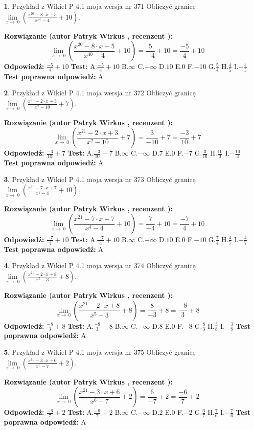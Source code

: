 \documentclass[12pt, a4paper]{article}
\theoremstyle{definition} %
\newtheorem{zad}{}
\newcommand{\zadStart}[1]{\begin{zad}#1\newline}
\newcommand{\zadStop}{\end{zad}}
\newcommand{\rozwStart}[2]{\noindent \textbf{Rozwiązanie (autor #1 , recenzent #2): }\newline}
\newcommand{\rozwStop}{\newline}
\newcommand{\odpStart}{\noindent \textbf{Odpowiedź:}\newline}
\newcommand{\odpStop}{\newline}
\newcommand{\testStart}{\noindent \textbf{Test:}\newline}
\newcommand{\testStop}{\newline}
\newcommand{\kluczStart}{\noindent \textbf{Test poprawna odpowiedź:}\newline}
\newcommand{\kluczStop}{\newline}
\begin{document}
\zadStart{Przykład z Wikieł P 4.1 moja wersja nr 371}
Obliczyć granicę $\lim\limits_{x\to\ 0}(\frac{x^{20}-8 \cdot x +5}{x^{40}-4}+10)$.
\zadStop
\rozwStart{Patryk Wirkus}{}
$$\lim\limits_{x\to\ 0}(\frac{x^{20}-8 \cdot x +5}{x^{40}-4}+10)=\frac{5}{-4}+10=\frac{-5}{4}+10$$
\rozwStop
\odpStart
$\frac{-5}{4}+10$
\odpStop
\testStart
A.$\frac{-5}{4}+10$
B.$\infty$
C.$-\infty$
D.$10$
E.$0$
F.$-10$
G.$\frac{5}{4}$
H.$\frac{4}{5}$
I.$-\frac{4}{5}$
\testStop
\kluczStart
A
\kluczStop



\zadStart{Przykład z Wikieł P 4.1 moja wersja nr 372}
Obliczyć granicę $\lim\limits_{x\to\ 0}(\frac{x^{21}-2 \cdot x +3}{x^{2}-10}+7)$.
\zadStop
\rozwStart{Patryk Wirkus}{}
$$\lim\limits_{x\to\ 0}(\frac{x^{21}-2 \cdot x +3}{x^{2}-10}+7)=\frac{3}{-10}+7=\frac{-3}{10}+7$$
\rozwStop
\odpStart
$\frac{-3}{10}+7$
\odpStop
\testStart
A.$\frac{-3}{10}+7$
B.$\infty$
C.$-\infty$
D.$7$
E.$0$
F.$-7$
G.$\frac{3}{10}$
H.$\frac{10}{3}$
I.$-\frac{10}{3}$
\testStop
\kluczStart
A
\kluczStop



\zadStart{Przykład z Wikieł P 4.1 moja wersja nr 373}
Obliczyć granicę $\lim\limits_{x\to\ 0}(\frac{x^{21}-7 \cdot x +7}{x^{4}-4}+10)$.
\zadStop
\rozwStart{Patryk Wirkus}{}
$$\lim\limits_{x\to\ 0}(\frac{x^{21}-7 \cdot x +7}{x^{4}-4}+10)=\frac{7}{-4}+10=\frac{-7}{4}+10$$
\rozwStop
\odpStart
$\frac{-7}{4}+10$
\odpStop
\testStart
A.$\frac{-7}{4}+10$
B.$\infty$
C.$-\infty$
D.$10$
E.$0$
F.$-10$
G.$\frac{7}{4}$
H.$\frac{4}{7}$
I.$-\frac{4}{7}$
\testStop
\kluczStart
A
\kluczStop



\zadStart{Przykład z Wikieł P 4.1 moja wersja nr 374}
Obliczyć granicę $\lim\limits_{x\to\ 0}(\frac{x^{21}-2 \cdot x +8}{x^{5}-3}+8)$.
\zadStop
\rozwStart{Patryk Wirkus}{}
$$\lim\limits_{x\to\ 0}(\frac{x^{21}-2 \cdot x +8}{x^{5}-3}+8)=\frac{8}{-3}+8=\frac{-8}{3}+8$$
\rozwStop
\odpStart
$\frac{-8}{3}+8$
\odpStop
\testStart
A.$\frac{-8}{3}+8$
B.$\infty$
C.$-\infty$
D.$8$
E.$0$
F.$-8$
G.$\frac{8}{3}$
H.$\frac{3}{8}$
I.$-\frac{3}{8}$
\testStop
\kluczStart
A
\kluczStop



\zadStart{Przykład z Wikieł P 4.1 moja wersja nr 375}
Obliczyć granicę $\lim\limits_{x\to\ 0}(\frac{x^{21}-3 \cdot x +6}{x^{6}-7}+2)$.
\zadStop
\rozwStart{Patryk Wirkus}{}
$$\lim\limits_{x\to\ 0}(\frac{x^{21}-3 \cdot x +6}{x^{6}-7}+2)=\frac{6}{-7}+2=\frac{-6}{7}+2$$
\rozwStop
\odpStart
$\frac{-6}{7}+2$
\odpStop
\testStart
A.$\frac{-6}{7}+2$
B.$\infty$
C.$-\infty$
D.$2$
E.$0$
F.$-2$
G.$\frac{6}{7}$
H.$\frac{7}{6}$
I.$-\frac{7}{6}$
\testStop
\kluczStart
A
\kluczStop
\end{document}
